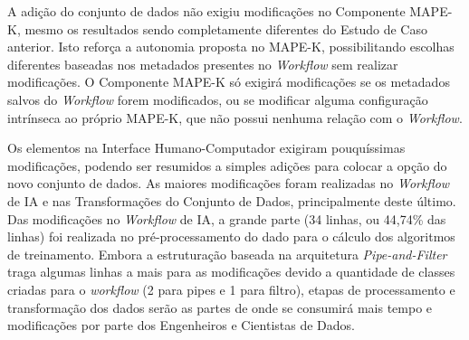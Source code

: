 \documentclass{article}
\begin{document}
\begin{table}[H]
\begin{center}
  \caption{Quantidade de modificações realizadas ao adicionar um novo conjunto de dados ao \textit{Workflow}}
\label{tbl:ManutencaoPipelineDataset}
\end{center}
\end{table}

A adição do conjunto de dados não exigiu modificações no Componente MAPE-K, mesmo os resultados sendo completamente diferentes do Estudo de Caso anterior. Isto reforça a autonomia proposta no MAPE-K, possibilitando escolhas diferentes baseadas nos metadados presentes no \textit{Workflow} sem realizar modificações. O Componente MAPE-K só exigirá modificações se os metadados salvos do \textit{Workflow} forem modificados, ou se modificar alguma configuração intrínseca ao próprio MAPE-K, que não possui nenhuma relação com o \textit{Workflow}. 

Os elementos na Interface Humano-Computador exigiram pouquíssimas modificações, podendo ser resumidos a simples adições para colocar a opção do novo conjunto de dados. As maiores modificações foram realizadas no \textit{Workflow} de IA e nas Transformações do Conjunto de Dados, principalmente deste último. Das modificações no \textit{Workflow} de IA, a grande parte (34 linhas, ou 44,74\% das linhas) foi realizada no pré-processamento do dado para o cálculo dos algoritmos de treinamento. Embora a estruturação baseada na arquitetura \textit{Pipe-and-Filter} traga algumas linhas a mais para as modificações devido a quantidade de classes criadas para o \textit{workflow} (2 para pipes e 1 para filtro), etapas de processamento e transformação dos dados serão as partes de onde se consumirá mais tempo e modificações por parte dos Engenheiros e Cientistas de Dados.
\end{document}
